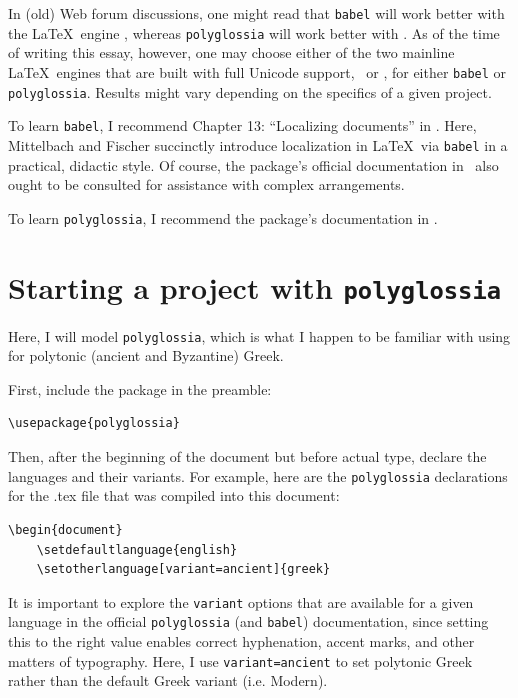 \documentclass{ltugboat}
\begin{document}
In (old) Web forum discussions, one might read that \texttt{babel} will work better with the \LaTeX\ engine \LuaLaTeX, whereas \texttt{polyglossia} will work better with \XeLaTeX. As of the time of writing this essay, however, one may choose either of the two mainline \LaTeX\ engines that are built with full Unicode support, \XeLaTeX\ or \LuaLaTeX, for either \texttt{babel} or \texttt{polyglossia}. Results might vary depending on the specifics of a given project.

To learn \texttt{babel}, I recommend Chapter 13: ``Localizing documents'' in . Here, Mittelbach and Fischer succinctly introduce localization in \LaTeX\ via \texttt{babel} in a practical, didactic style. Of course, the package's official documentation in \CTAN\ also ought to be consulted for assistance with complex arrangements.

To learn \texttt{polyglossia}, I recommend the package's documentation in \CTAN.

\section{Starting a project with \texttt{polyglossia}}

Here, I will model \texttt{polyglossia}, which is what I happen to be familiar with using for polytonic (ancient and Byzantine) Greek.

First, include the package in the preamble:
\begin{verbatim}
\usepackage{polyglossia}
\end{verbatim} 
Then, after the beginning of the document but before actual type, declare the languages and their variants. For example, here are the \texttt{polyglossia} declarations for the .tex file that was compiled into this document:

\begin{verbatim}
\begin{document}
	\setdefaultlanguage{english}
	\setotherlanguage[variant=ancient]{greek}
\end{verbatim}
It is important to explore the \texttt{variant} options that are available for a given language in the official \texttt{polyglossia} (and \texttt{babel}) documentation, since setting this to the right value enables correct hyphenation, accent marks, and other matters of typography. Here, I use \texttt{variant=ancient} to set polytonic Greek rather than the default Greek variant (i.e. Modern).
\end{document}
